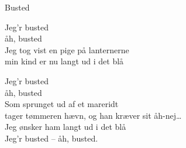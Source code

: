 \begin{song}{Busted}
  \begin{SBChorus}
    Jeg’r busted\\
    åh, busted\\
    Jeg tog vist en pige på lanternerne\\
    min kind er nu langt ud i det blå
  \end{SBChorus}

  \begin{SBChorus}
    Jeg’r busted\\
    åh, busted\\
    Som sprunget ud af et mareridt\\
    tager tømmeren hævn, og han kræver sit åh-nej\ldots\\
    Jeg ønsker ham langt ud i det blå\\
    Jeg’r busted – åh, busted.
  \end{SBChorus}
\end{song}






